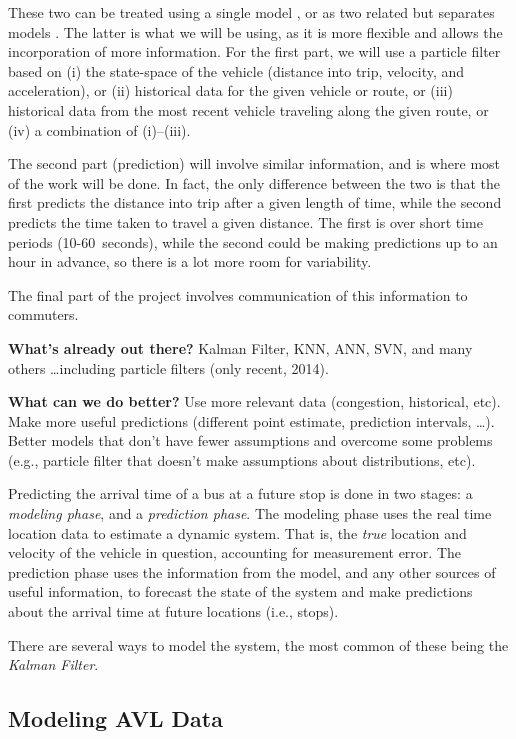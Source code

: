 \documentclass[12pt,a4paper]{article}
\begin{document}
These two can be treated using a single model \citep{cn},
or as two related but separates models \citep{cn}.
The latter is what we will be using, as it is more flexible and allows the incorporation of more information.
For the first part, we will use a particle filter based on
(i) the state-space of the vehicle (distance into trip, velocity, and acceleration),
or (ii) historical data for the given vehicle or route,
or (iii) historical data from the most recent vehicle traveling along the given route,
or (iv) a combination of (i)--(iii).

The second part (prediction) will involve similar information, and is where most of the work will be done.
In fact, the only difference between the two is that the first predicts the distance into trip after a given
length of time, while the second predicts the time taken to travel a given distance.
The first is over short time periods (10-60~seconds), 
while the second could be making predictions up to an hour in advance, so there is a lot more room for variability.

The final part of the project involves communication of this information to commuters.


\textbf{What's already out there?}
Kalman Filter, KNN, ANN, SVN, and many others \ldots including particle filters (only recent, 2014).

\textbf{What can we do better?}
Use more relevant data (congestion, historical, etc).
Make more useful predictions (different point estimate, prediction intervals, \ldots).
Better models that don't have fewer assumptions and overcome some problems 
(e.g., particle filter that doesn't make assumptions about distributions, etc).


Predicting the arrival time of a bus at a future stop is done in two stages:
a \emph{modeling phase}, and a \emph{prediction phase}.
The modeling phase uses the real time location data to estimate a dynamic system.
That is, the \emph{true} location and velocity of the vehicle in question,
accounting for measurement error.
The prediction phase uses the information from the model, and any other sources of useful information,
to forecast the state of the system and make predictions about the arrival time at future locations (i.e., stops).


There are several ways to model the system, the most common of these being the \emph{Kalman Filter}.



\subsection{Modeling AVL Data}
\end{document}
